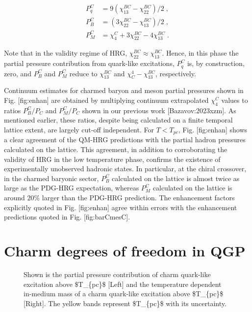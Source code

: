 \documentclass[11pt,a4paper]{article}
\begin{document}
$$\begin{align}
	P^C_{q}&=9(\chi^{BC}_{13}-\chi^{BC}_{22})/2\; , 
	 	\\
	P^C_{B}&=(3\chi^{BC}_{22}-\chi^{BC}_{13})/2\; , 
	\\
	P^C_{M}&=\chi^{C}_{4}+3\chi^{BC}_{22}-4\chi^{BC}_{13} \; .
	
\end{align}$$

Note that in the validity regime of HRG, $\chi^{BC}_{22}\approx\chi^{BC}_{13}$. Hence, in this phase the partial pressure contribution from quark-like excitations, $P^C_q$ is, by construction, zero, and $P^C_B$ and $P^C_M$ reduce to $\chi^{BC}_{13}$ and $\chi^4_C-\chi^{BC}_{13}$, respectively.

Continuum estimates for charmed baryon and meson partial pressures shown in Fig. [fig:enhan] are obtained by multiplying continuum extrapolated $\chi^C_4$ values to ratios $P^C_B/P_C$ and $P^C_M/P_C$  shown in our previous work [Bazavov:2023xzm]. As mentioned earlier, these ratios, despite being calculated on a finite temporal lattice extent, are largely cut-off independent. For $T<T_{pc}$, Fig. [fig:enhan] shows a clear agreement of the QM-HRG predictions with the  partial hadron pressures calculated on the lattice. This agreement, in addition to corroborating  the validity of HRG in the low temperature phase, confirms the existence of experimentally unobserved hadronic states. In particular, at the chiral crossover, in the charmed baryonic sector, $P^C_B$ calculated on the lattice is almost twice as large as the PDG-HRG expectation, whereas $P^C_M$ calculated on the lattice is around $20\%$ larger than the  PDG-HRG prediction. The enhancement factors explicitly quoted in Fig. [fig:enhan] agree within errors with the enhancement predictions quoted in Fig. [fig:barCmesC].

\section{Charm degrees of freedom in QGP}

\begin{figure}[h]
\caption{Shown is the partial pressure contribution of charm quark-like excitation above \$T\_\{pc\}\$ [Left] and the temperature dependent in-medium mass of a charm quark-like excitation above \$T\_\{pc\}\$ [Right]. The yellow bands represent \$T\_\{pc\}\$ with its uncertainty.}
\end{figure}

\begin{figure}[h]
\end{figure}
\end{document}
